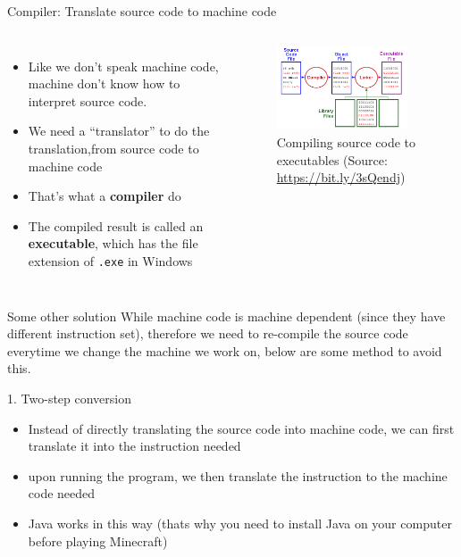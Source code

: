\documentclass[10pt,xcolor={table,dvipsnames},t]{beamer}
\begin{document}
\begin{frame}{Compiler: Translate source code to machine code}
  \begin{columns}
    \begin{itemize}
      \item Like we don't speak machine code, machine don't know how to interpret source code.
      \item We need a ``translator'' to do the translation,from source code to machine code
      \item That's what a \textbf{compiler} do
      \item The compiled result is called an \textbf{executable}, which has the file extension of \texttt{.exe} in Windows
    \end{itemize}
  

    \begin{figure}
      \includegraphics[width=0.9\textwidth]{img/compiling.png}
      \caption{Compiling source code to executables (Source: \href{https://bit.ly/3sQendj}{https://bit.ly/3sQendj})}
      \label{fig:compiling}
    \end{figure}
  \end{columns}
  
\end{frame}

\begin{frame}{Some other solution}
  While machine code is machine dependent (since they have different instruction set), therefore we need to re-compile the source code everytime we change the machine we work on, below are some method to avoid this.
  \begin{block}{1. Two-step conversion}
    \begin{itemize}
      \item Instead of directly translating the source code into machine code, we can first translate it into the instruction needed
      \item upon running the program, we then translate the instruction to the machine code needed
      \item Java works in this way (thats why you need to install Java on your computer before playing Minecraft)
    \end{itemize}
  \end{block}
\end{frame}
\end{document}
